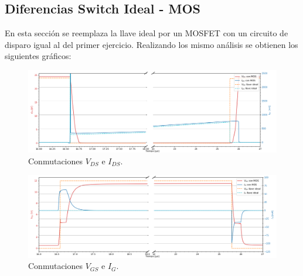 



\subsection{Diferencias Switch Ideal - MOS}
En esta sección se reemplaza la llave ideal por un MOSFET con un circuito de disparo igual al del primer ejercicio. Realizando los mismo análisis se obtienen los siguientes gráficos:

\begin{multicols}{2}
\begin{figure}[H]
	\centering
	\includegraphics[width=\linewidth]{ImagenesEjercicio-3/ids-vds-2v3}
	\caption{Conmutaciones $V_{DS}$ e  $I_{DS}$.}
	\label{fig:ej3:conmutacionON_OFF_VDS_IDS}
\end{figure}
\begin{figure}[H]
	\centering
	\includegraphics[width=\linewidth]{ImagenesEjercicio-3/ig-vgs-2v3}
	\caption{Conmutaciones $V_{GS}$ e  $I_{G}$.}
	\label{fig:ej3:conmutacionON_OFF_VGS_IG}
\end{figure}
\end{multicols}
